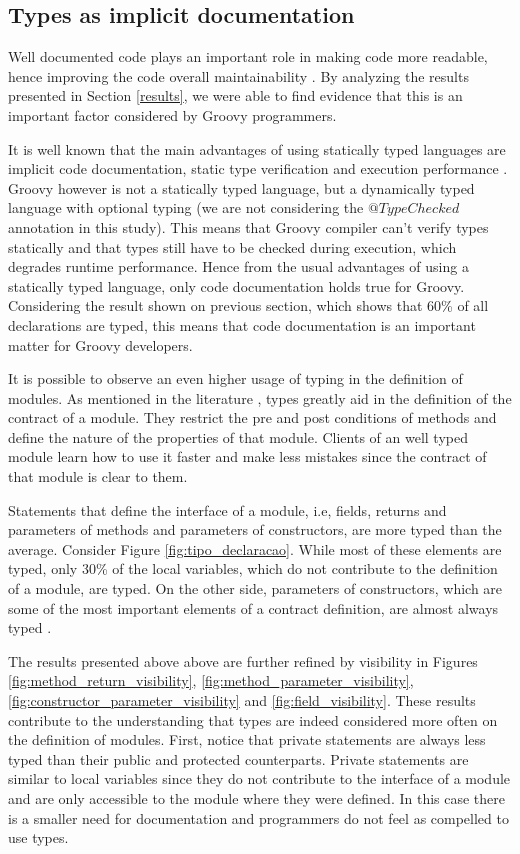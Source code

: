 \documentclass[preprint]{sigplanconf}
\begin{document}
\subsection{Types as implicit documentation\label{discussion-q1}}
Well documented code plays an important role in making code more readable, hence improving the code overall maintainability \cite{Iso2004}.
By analyzing the results presented in Section \ref{results}, we were able to find evidence that this is an important factor considered by Groovy programmers.

It is well known that the main advantages of using statically typed languages are implicit code documentation, static type verification and execution performance \cite{type_systems,mayer2012static}.
Groovy however is not a statically typed language, but a dynamically typed language with optional typing (we are not considering the $@TypeChecked$ annotation in this study).
This means that Groovy compiler can't verify types statically and that types still have to be checked during execution, which degrades runtime performance.
Hence from the usual advantages of using a statically typed language, only code documentation holds true for Groovy.
Considering the result shown on previous section, which shows that 60\% of all declarations are typed, this means that code documentation is an important matter for Groovy developers.

It is possible to observe an even higher usage of typing in the definition of modules.
As mentioned in the literature \cite{Meyer88, Meijer04, Wadler04, Plosch97, Flanagan2006, Furr09}, types greatly aid in the definition of the contract of a module.
They restrict the pre and post conditions of methods and define the nature of the properties of that module.
Clients of an well typed module learn how to use it faster and make less mistakes since the contract of that module is clear to them.

Statements that define the interface of a module, i.e, fields, returns and parameters of methods and parameters of constructors, are more typed than the average.
Consider Figure \ref{fig:tipo_declaracao}.
While most of these elements are typed, only 30\%  of the local variables, which do not contribute to the definition of a module, are typed. On the other side, parameters of constructors, which are some of the most important elements of a contract definition, are almost always typed \cite{Meijer04}. 

The results presented above above are further refined by visibility in Figures \ref{fig:method_return_visibility}, \ref{fig:method_parameter_visibility}, \ref{fig:constructor_parameter_visibility} and \ref{fig:field_visibility}.
These results contribute to the understanding that types are indeed considered more often on the definition of modules.
First, notice that private statements are always less typed than their public and protected counterparts.
Private statements are similar to local variables since they do not contribute to the interface of a module and are only accessible to the module where they were defined.
In this case there is a smaller need for documentation and programmers do not feel as compelled to use types.
\end{document}
